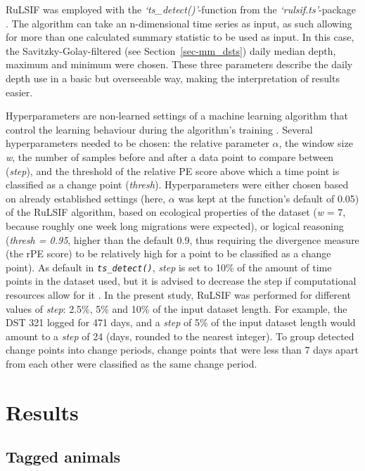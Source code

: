 \documentclass[
  authoryear,
  review,
  3p]{elsarticle}
\begin{document}
RuLSIF was employed with the \emph{`ts\_detect()'}-function from the
\emph{`rulsif.ts'}-package \citep{brubaker_2021}. The algorithm can take
an n-dimensional time series as input, as such allowing for more than
one calculated summary statistic to be used as input. In this case, the
Savitzky-Golay-filtered (see Section~\ref{sec-mm_dsts}) daily median
depth, maximum and minimum were chosen. These three parameters describe
the daily depth use in a basic but overseeable way, making the
interpretation of results easier.

Hyperparameters are non-learned settings of a machine learning algorithm
that control the learning behaviour during the algorithm's training
\citep{yang_2020}. Several hyperparameters needed to be chosen: the
relative parameter \(\alpha\), the window size \emph{w}, the number of
samples before and after a data point to compare between (\emph{step}),
and the threshold of the relative PE score above which a time point is
classified as a change point (\emph{thresh}). Hyperparameters were
either chosen based on already established settings (here, \(\alpha\)
was kept at the function's default of 0.05) of the RuLSIF algorithm,
based on ecological properties of the dataset (\emph{w} = 7, because
roughly one week long migrations were expected), or logical reasoning
(\emph{thresh = 0.95}, higher than the default 0.9, thus requiring the
divergence measure (the rPE score) to be relatively high for a point to
be classified as a change point). As default in
\emph{\texttt{ts\_detect()}}, \emph{step} is set to 10\% of the amount
of time points in the dataset used, but it is advised to decrease the
step if computational resources allow for it \citep[since smaller steps
increase computation time,][]{brubaker_2021}. In the present study,
RuLSIF was performed for different values of \emph{step}: 2.5\%, 5\% and
10\% of the input dataset length. For example, the DST 321 logged for
471 days, and a \emph{step} of 5\% of the input dataset length would
amount to a \emph{step} of 24 (days, rounded to the nearest integer). To
group detected change points into change periods, change points that
were less than 7 days apart from each other were classified as the same
change period.

\hypertarget{sec-results}{%
\section{Results}\label{sec-results}}

\hypertarget{tagged-animals}{%
\subsection{Tagged animals}\label{tagged-animals}}
\end{document}
